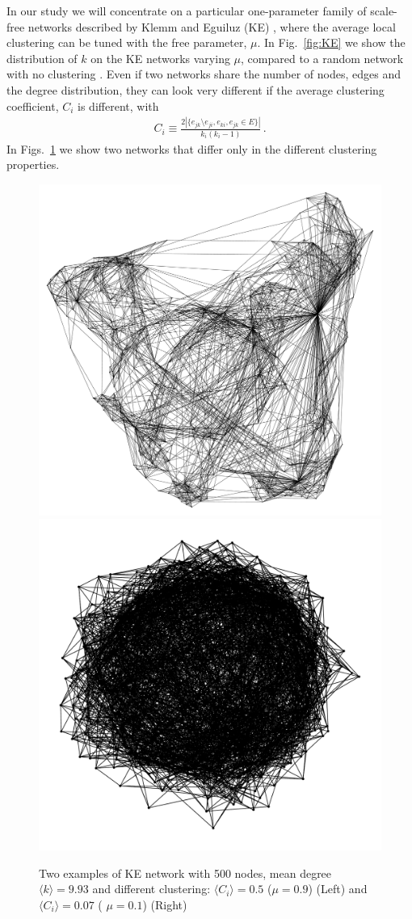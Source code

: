 \documentclass[a4paper,oneside,11pt]{article}
\begin{document}
In our study we will concentrate on a particular one-parameter family of scale-free networks described by Klemm and Eguiluz (KE)
\cite{Klemm_2002}, where the average local clustering can be tuned with the free parameter, \(\mu\). In Fig.~\ref{fig:KE} we show the distribution of $k$ on the KE networks varying $\mu$, compared to a random network with no clustering . Even if two networks share the number of nodes, edges and the degree distribution, they can look very different if the average clustering coefficient, $C_i$ is different, with
\begin{eqnarray}
C_i \equiv \frac{2|\{e_{jk}\setminus e_{ji},e_{ki},e_{jk}\in E\}|}{k_i(k_i-1)}\,.
\end{eqnarray}
In Figs.~\ref{fig:networks} we show two networks that differ only in the  different clustering properties.

\begin{figure}[htbp]
\centering
\includegraphics[width=.45\linewidth]{ke_05_09.pdf} \includegraphics[width=.45\linewidth]{ke_05_01.pdf}
\caption{Two examples of KE network with 500 nodes, mean degree \(\langle k \rangle=9.93\) and different clustering: \(\langle C_i \rangle = 0.5\) (\(\mu=0.9\)) (Left) and \(\langle C_i \rangle = 0.07\) ( \(\mu=0.1\)) (Right)}
\label{fig:networks}
\end{figure}
\end{document}

